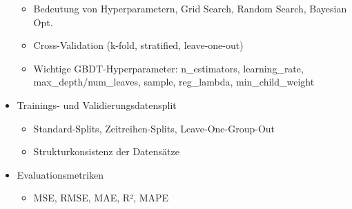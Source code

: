 \begin{itemize}
\begin{itemize}
    \item Bedeutung von Hyperparametern, Grid Search, Random Search, Bayesian Opt.
    \item Cross-Validation (k-fold, stratified, leave-one-out)
    \item Wichtige GBDT-Hyperparameter: n\_estimators, learning\_rate, max\_depth/num\_leaves, sample, reg\_lambda, min\_child\_weight
  \end{itemize}
  \item Trainings- und Validierungsdatensplit
  \begin{itemize}
    \item Standard-Splits, Zeitreihen-Splits, Leave-One-Group-Out
    \item Strukturkonsistenz der Datensätze
  \end{itemize}
  \item Evaluationsmetriken
  \begin{itemize}
    \item MSE, RMSE, MAE, R², MAPE
  \end{itemize}
\end{itemize}

